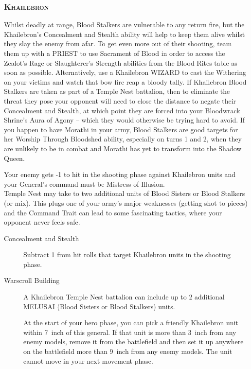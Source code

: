 \subsubsection{\textsc{Khailebron}}\label{temple:khailebron}
Whilst deadly at range, Blood Stalkers are vulnerable to any return fire, but
the Khailebron’s Concealment and Stealth ability will help to keep them alive
whilst they slay the enemy from afar. To get even more out of their shooting,
team them up with a PRIEST to use Sacrament of Blood in order to access the
Zealot’s Rage or Slaughterer’s Strength abilities from the Blood Rites table as
soon as possible. Alternatively, use a Khailebron WIZARD to cast the Withering
on your victims and watch that bow fire reap a bloody tally.  If Khailebron
Blood Stalkers are taken as part of a Temple Nest battalion, then to eliminate
the threat they pose your opponent will need to close the distance to negate
their Concealment and Stealth, at which point they are forced into your
Bloodwrack Shrine’s Aura of Agony – which they would otherwise be trying hard
to avoid. If you happen to have Morathi in your army, Blood Stalkers are good
targets for her Worship Through Bloodshed ability, especially on turns 1 and 2,
when they are unlikely to be in combat and Morathi has yet to transform into
the Shadow Queen.

Your enemy gets -1 to hit in the shooting phase against Khailebron units and
your General's command must be Mistress of Illusion.\\
Temple Nest may take to two additional units of Blood Sisters or Blood Stalkers
(or mix). This plugs one of your army's major weaknesses (getting shot to
pieces) and the Command Trait can
lead to some fascinating tactics, where your opponent never feels safe.
\begin{description}
  \item [Concealment and Stealth] Subtract 1 from hit rolls 
    that target Khailebron units in the shooting phase.
  \item [Warscroll Building] 
    A Khailebron Temple Nest battalion can include up to
    2 additional MELUSAI (Blood Sisters or Blood Stalkers) units.
\item []
     At the start of your hero phase, you can pick
        a friendly Khailebron unit within 7~inch of this general. If that unit
        is more than 3~inch from any enemy models, remove it from the
        battlefield and then set it up anywhere on the battlefield more than
        9~inch from any enemy models. The unit cannot move in your next movement
        phase. 
\end{description}

